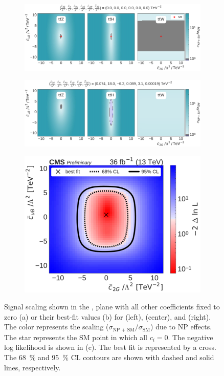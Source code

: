 \begin{figure}
  \vspace{-1cm}
  \begin{subfigure}{\linewidth}
    \centering
    \includegraphics[width=\linewidth]{figures/thirteen-TeV/scaling-frozen/c2G_cuB}
    \caption{}
  \end{subfigure}
  \begin{subfigure}{\linewidth}
    \centering
    \includegraphics[width=\linewidth]{figures/thirteen-TeV/scaling/c2G_cuB}
    \caption{}
  \end{subfigure}
  \begin{subfigure}{\linewidth}
    \centering
    \includegraphics[width=0.6\linewidth]{figures/thirteen-TeV/nll/c2G_cuB}
    \caption{}
  \end{subfigure}
  \vspace{-1cm}
  \setlength{\capwidth}{15cm}
  \caption[Signal scaling and profile likelihood scan in the \ctwoG, \cuB plane]{Signal scaling
    shown in the \ctwoG, \cuB plane with all other coefficients fixed to zero (a) or their best-fit
    values (b) for \ttZ (left), \ttH (center), and \ttW (right). The color represents the scaling
    ($\sigma_\text{NP + SM} / \sigma_\text{SM}$) due to NP effects. The star represents the SM point in
    which all $c_i=0$. The negative log likelihood is shown in (c). The best fit is represented by a
    cross. The \SI{68}{\percent} and \SI{95}{\percent} CL contours are shown with dashed and solid
  lines, respectively.}
\end{figure}

